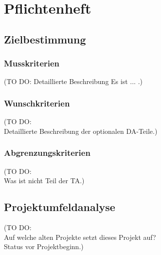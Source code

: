 


\chapter{Pflichtenheft}
\section{Zielbestimmung}
\subsection{Musskriterien}
(TO DO:
Detaillierte Beschreibung Es ist ... .)
\subsection{Wunschkriterien}
(TO DO: \\
Detaillierte Beschreibung der optionalen DA-Teile.)
\subsection{Abgrenzungskriterien}
(TO DO: \\
Was ist nicht Teil der TA.)
\section{Projektumfeldanalyse}
(TO DO: \\
Auf welche alten Projekte setzt dieses Projekt auf? \\
Status vor Projektbeginn.)
